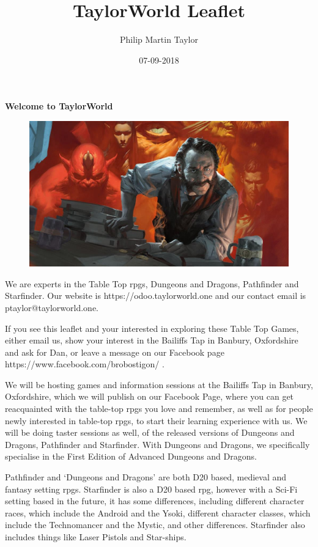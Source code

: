 \documentclass[12pt]{extreport}
\date{07-09-2018}
\author{Philip Martin Taylor}
\title{TaylorWorld Leaflet}
\begin{document}
\begin{center}
\textbf{Welcome to TaylorWorld\texttrademark}
\end{center}
\begin{figure}[h]
  \centering
  \includegraphics[scale=0.15]{alchemist.jpg}
\end{figure}
We are experts in the Table Top \glspl{rpg}, Dungeons and Dragons, Pathfinder and Starfinder. Our website is https://odoo.taylorworld.one and our contact email is ptaylor@taylorworld.one.
 
If you see this leaflet and your interested in exploring these Table Top Games, either email us, show your interest in the Bailiffs Tap in Banbury, Oxfordshire and ask for Dan, or leave a message on our Facebook page https://www.facebook.com/brobostigon/ .
 
We will be hosting games and information sessions at the Bailiffs Tap in Banbury, Oxfordshire, which we will publish on our Facebook Page, where you can get reacquainted with the table-top \glspl{rpg} you love and remember, as well as for people newly interested in table-top \glspl{rpg}, to start their learning experience with us. We will be doing taster sessions as well, of the released versions of Dungeons and Dragons, Pathfinder and Starfinder. With Dungeons and Dragons, we specifically specialise in the First Edition of Advanced Dungeons and Dragons.
 
Pathfinder and `Dungeons and Dragons' are both D20 based, medieval and fantasy setting \glspl{rpg}. Starfinder is also a D20 based \gls{rpg}, however with a Sci-Fi setting based in the future, it has some differences, including different character races, which include the Android and the Ysoki, different character classes, which include the Technomancer and the Mystic, and other differences. Starfinder also includes things like Laser Pistols and Star-ships.
 
\end{document}
